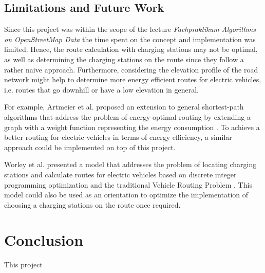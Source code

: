 \documentclass[a4paper]{article}
\begin{document}
\subsection{Limitations and Future Work}
Since this project was within the scope of the lecture \textit{Fachpraktikum Algorithms on OpenStreetMap Data} the time spent on the concept and implementation was limited.
Hence, the route calculation with charging stations may not be optimal, as well as determining the charging stations on the route since they follow a rather naive approach.
Furthermore, considering the elevation profile of the road network might help to determine more energy efficient routes for electric vehicles, i.e. routes that go downhill or have a low elevation in general.\par\medskip
For example, Artmeier et al. \cite{Artmeier2010} proposed an extension to general shortest-path algorithms that address the problem of energy-optimal routing by extending a graph with a weight function representing the energy consumption \cite{Artmeier2010}.
To achieve a better routing for electric vehicles in terms of energy efficiency, a similar approach could be implemented on top of this project.\par\medskip
Worley et al. \cite{Worley2012} presented a model that addresses the problem of locating charging stations and calculate routes for electric vehicles based on discrete integer programming optimization and the traditional Vehicle Routing Problem \cite{Worley2012}.
This model could also be used as an orientation to optimize the implementation of choosing a charging stations on the route once required.
\section{Conclusion}
This project 


\end{document}
